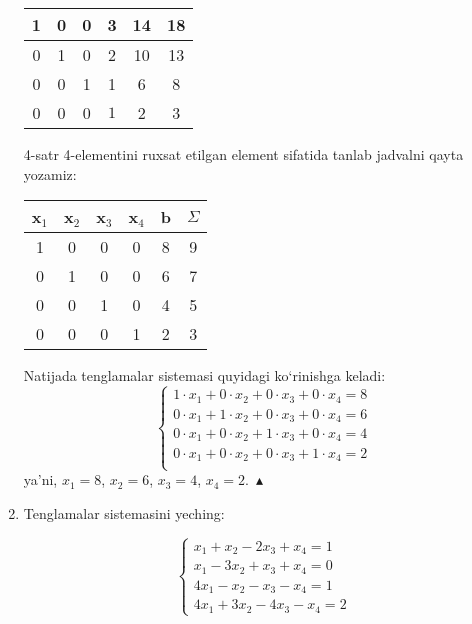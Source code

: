 \begin{enumerate}
\begin{center}
\begin{tabular}{|c|c|c|c|c|c|}
		1&0&0&3&14&18\\ \hline
		0&1&0&2&10&13\\ \hline
		0&0&1&1&6&8\\ \hline
		0&0&0&$\boxed{1}$&2&3\\ \hline	
	\end{tabular}
\end{center}
4-satr 4-elementini ruxsat etilgan element sifatida tanlab jadvalni qayta yozamiz:
\begin{center}
	\begin{tabular}{|c|c|c|c|c|c|}
		\hline
		\textbf{x}$_{1}$&\textbf{x}$_{2}$&\textbf{x}$_{3}$&\textbf{x}$_{4}$&\textbf{b}&$\Sigma$\\ \hline
		
		1&0&0&0&8&9\\ \hline
		0&1&0&0&6&7\\ \hline
		0&0&1&0&4&5\\ \hline
		0&0&0&1&2&3\\ \hline
	\end{tabular}
\end{center}
Natijada tenglamalar sistemasi quyidagi ko`rinishga keladi:
$$\begin{cases}
	1\cdot x_{1}+0\cdot x_{2}+0\cdot x_{3}+0\cdot x_{4}=8\\
	0\cdot x_{1}+1\cdot x_{2}+0\cdot x_{3}+0\cdot x_{4}=6\\
	0\cdot x_{1}+0\cdot x_{2}+1\cdot x_{3}+0\cdot x_{4}=4\\
	0\cdot x_{1}+0\cdot x_{2}+0\cdot x_{3}+1\cdot x_{4}=2\\
\end{cases}$$
ya'ni, $x_{1}=8$, $x_{2}=6$, $x_{3}=4$, $x_{4}=2.\ \blacktriangle$
	\item Tenglamalar sistemasini yeching:
	
	$$\begin{cases}
		x_{1}+x_{2}-2x_{3}+x_{4}=1\\
		x_{1}-3x_{2}+x_{3}+x_{4}=0\\
		4x_{1}-x_{2}-x_{3}-x_{4}=1\\
		4x_{1}+3x_{2}-4x_{3}-x_{4}=2
	\end{cases}$$


\end{enumerate}
